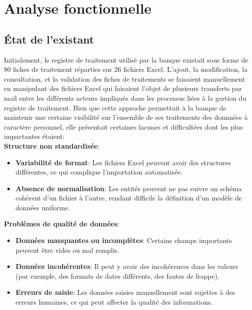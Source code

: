 \chapter{Analyse fonctionnelle}

\section{État de l'existant}
Initialement, le registre de traitement utilisé par la banque existait sous forme de 80 fiches de traitement réparties sur 26 fichiers Excel. L'ajout, la modification, la consultation, et la validation des fiches de traitements se faisaient manuellement en manipulant des fichiers Excel qui faisaient l'objet de plusieurs transferts par mail entre les différents acteurs impliqués dans les processus liées à la gestion du registre de traitement. Bien que cette approche permettait à la banque de maintenir une certaine visibilité sur l'ensemble de ses traitements des donnnées à caractère personnel, elle présentait certaines lacunes et difficultées dont les plus impactantes étaient: \\

\noindent \textbf{Structure non standardisée}:
\begin{itemize}
    \item \textbf{Variabilité de format}: Les fichiers Excel peuvent avoir des structures différentes, ce qui complique l'importation automatisée.
    \item \textbf{Absence de normalisation}: Les entités peuvent ne pas suivre un schéma cohérent d'un fichier à l'autre, rendant difficile la définition d'un modèle de données uniforme.
\end{itemize}
\vspace{.4cm}
\noindent \textbf{Problèmes de qualité de données}:
\begin{itemize}
    \item \textbf{Données manquantes ou incomplètes}: Certains champs importants peuvent être vides ou mal remplis.
    \item \textbf{Données incohérentes}: Il peut y avoir des incohérences dans les valeurs (par exemple, des formats de dates différents, des fautes de frappe).
    \item \textbf{Erreurs de saisie}: Les données saisies manuellement sont sujettes à des erreurs humaines, ce qui peut affecter la qualité des informations.
\end{itemize}
\vspace{.4cm}

